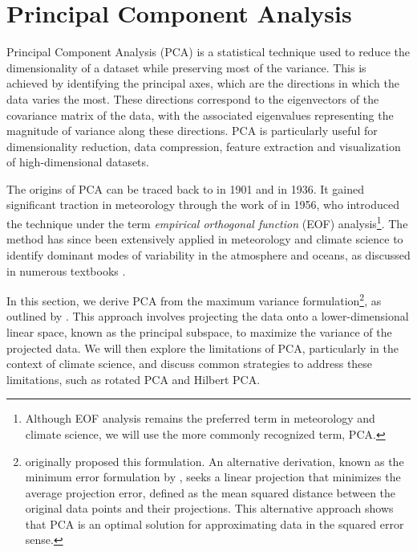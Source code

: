 \section{Principal Component Analysis}
\label{sec:theory:pca}
Principal Component Analysis (PCA) is a statistical technique used to reduce the dimensionality of a dataset while preserving most of the variance. This is achieved by identifying the principal axes, which are the directions in which the data varies the most. These directions correspond to the eigenvectors of the covariance matrix of the data, with the associated eigenvalues representing the magnitude of variance along these directions. PCA is particularly useful for dimensionality reduction, data compression, feature extraction and visualization of high-dimensional datasets. 

The origins of PCA can be traced back to \citet{pearson_lines_1901} in 1901 and \citet{hotelling_relations_1936} in 1936. It gained significant traction in meteorology through the work of \citet{lorenz_empirical_1956} in 1956, who introduced the technique under the term \textit{empirical orthogonal function} (EOF) analysis\footnote{Although EOF analysis remains the preferred term in meteorology and climate science, we will use the more commonly recognized term, PCA.}. The method has since been extensively applied in meteorology and climate science to identify dominant modes of variability in the atmosphere and oceans, as discussed in numerous textbooks \cite[e.g.][]{preisendorfer_principal_1988,jolliffe_principal_2002,storch_statistical_1999,hannachi_patterns_2021,wilks_statistical_2019,delsole_statistical_2022}. 

In this section, we derive PCA from the maximum variance formulation\footnote{\citet{hotelling_relations_1936} originally proposed this formulation. An alternative derivation, known as the minimum error formulation by \citet{pearson_lines_1901}, seeks a linear projection that minimizes the average projection error, defined as the mean squared distance between the original data points and their projections. This alternative approach shows that PCA is an optimal solution for approximating data in the squared error sense.}, as outlined by \citet[][pp.~561-563]{bishop_pattern_2006}. This approach involves projecting the data onto a lower-dimensional linear space, known as the principal subspace, to maximize the variance of the projected data. We will then explore the limitations of PCA, particularly in the context of climate science, and discuss common strategies to address these limitations, such as rotated PCA and Hilbert PCA.


